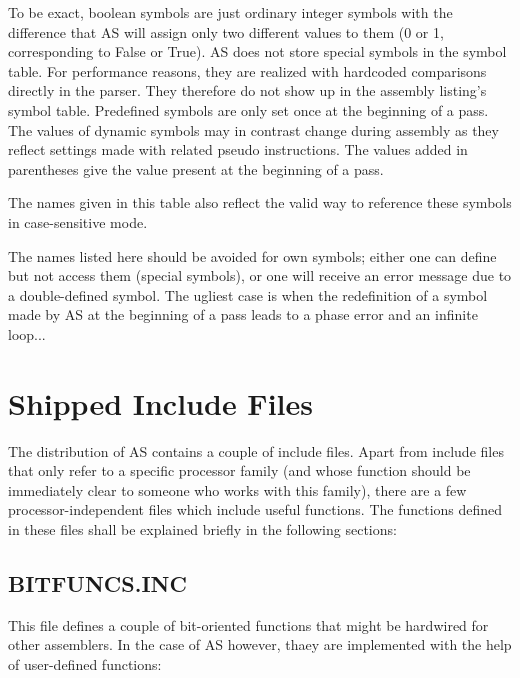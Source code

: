 \documentclass[12pt,twoside]{report}
\newcommand{\asname}{{AS}}
\begin{document}
To be exact, boolean symbols are just ordinary integer symbols with the
difference that \asname{} will assign only two different values to them (0 or 1,
corresponding to False or True).  \asname{} does not store special symbols
in the symbol table.  For performance reasons, they are realized with
hardcoded comparisons directly in the parser.  They therefore do not
show up in the assembly listing's symbol table.  Predefined symbols
are only set once at the beginning of a pass.  The values of dynamic
symbols may in contrast change during assembly as they reflect
settings made with related pseudo instructions.  The values added in
parentheses give the value present at the beginning of a pass.

The names given in this table also reflect the valid way to reference
these symbols in case-sensitive mode.

The names listed here should be avoided for own symbols; either one
can define but not access them (special symbols), or one will receive
an error message due to a double-defined symbol.  The ugliest case is
when the redefinition of a symbol made by \asname{} at the beginning of a
pass leads to a phase error and an infinite loop...


\cleardoublepage
\chapter{Shipped Include Files}

The distribution of \asname{} contains a couple of include files.  Apart from
include files that only refer to a specific processor family (and whose
function should be immediately clear to someone who works with this
family), there are a few processor-independent files which include useful
functions.  The functions defined in these files shall be explained
briefly in the following sections:

\section{BITFUNCS.INC}

This file defines a couple of bit-oriented functions that might be
hardwired for other assemblers.  In the case of \asname{} however, thaey are
implemented with the help of user-defined functions:
\end{document}
